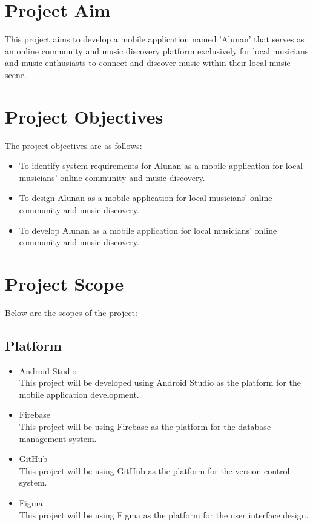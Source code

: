 \section{Project Aim}
This project aims to develop a mobile application named 'Alunan' that serves as an online community and music discovery platform exclusively for local musicians and music enthusiasts to connect and discover music within their local music scene.

\section{Project Objectives}
The project objectives are as follows:
\begin{itemize}
    \item To identify system requirements for Alunan as a mobile application for local musicians' online community and music discovery.
    \item To design Alunan as a mobile application for local musicians' online community and music discovery.
    \item To develop Alunan as a mobile application for local musicians' online community and music discovery.
\end{itemize}

\section{Project Scope}
Below are the scopes of the project:

\subsection{Platform}
\begin{itemize}
    \item Android Studio\\
    This project will be developed using Android Studio as the platform for the mobile application development.
    \item Firebase\\
    This project will be using Firebase as the platform for the database management system.
    \item GitHub\\
    This project will be using GitHub as the platform for the version control system.
    \item Figma\\
    This project will be using Figma as the platform for the user interface design.
\end{itemize}

